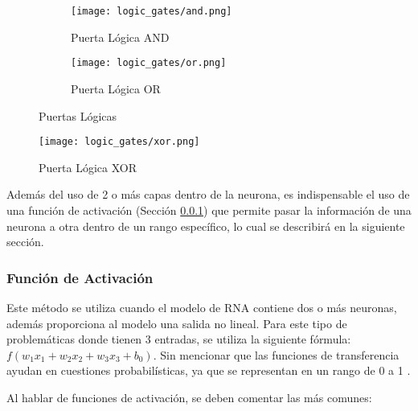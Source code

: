         \begin{figure}[H]
            \begin{subfigure}[H]{0.49\textwidth}
                \texttt{[image: logic\_gates/and.png]}
                \caption{Puerta Lógica AND}
                \label{fig:and_logic_gate}
            \end{subfigure}
            \hfill
            \begin{subfigure}[H]{0.49\textwidth}
                \texttt{[image: logic\_gates/or.png]}
                \caption{Puerta Lógica OR}
                \label{fig:or_logic_gate}
            \end{subfigure}
            \caption{Puertas Lógicas}
            \label{fig:logic_gates}
        \end{figure}

        \begin{figure}[H]
            \centering
            \texttt{[image: logic\_gates/xor.png]}
            \caption{Puerta Lógica XOR}
            \label{fig:xor_logic_gate}
        \end{figure}

        Además del uso de 2 o más capas dentro de la neurona, es indispensable el uso de una función de activación (Sección \ref{sec:activation}) que permite pasar la información de una neurona a otra dentro de un rango específico, lo cual se describirá en la siguiente sección.

        \subsubsection{Función de Activación} \label{sec:activation}

        Este método se utiliza cuando el modelo de RNA contiene dos o más neuronas, además proporciona al modelo una salida no lineal. Para este tipo de problemáticas donde tienen 3 entradas, se utiliza la siguiente fórmula: $f(w_1x_1 + w_2x_2 + w_3x_3 + b_0)$. Sin mencionar que las funciones de transferencia ayudan en cuestiones probabilísticas, ya que se representan en un rango de 0 a 1 \cite{renganathan2019}.

        Al hablar de funciones de activación, se deben comentar las más comunes:
        

